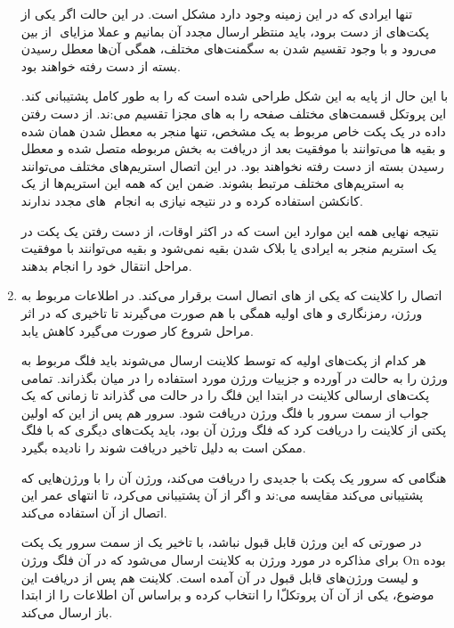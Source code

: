 \documentclass[12pt]{article}
\begin{document}
\begin{enumerate}
	تنها ایرادی که در این زمینه وجود دارد مشکل  است. در این حالت اگر یکی از پکت‌های  از دست برود، باید منتظر ارسال مجدد آن بمانیم و عملا مزایای ‌ از بین می‌رود و با وجود تقسیم شدن به سگمنت‌های مختلف، همگی ‌آن‌ها معطل رسیدن بسته از دست رفته خواهند بود.
	
	با این حال  از پایه به این شکل طراحی شده است که  را به طور کامل پشتیبانی کند. این پروتکل قسمت‌های مختلف صفحه را به  های مجزا تقسیم می‌:ند. از دست رفتن داده در یک پکت خاص مربوط به یک  مشخص، تنها منجر به معطل شدن همان  شده و بقیه  ها می‌توانند با موفقیت بعد از دریافت به بخش مربوطه متصل شده و معطل رسیدن بسته  از دست رفته نخواهند بود. در این اتصال استریم‌های مختلف  می‌توانند به استریم‌های مختلف  مرتبط بشوند. ضمن این که همه این استریم‌ها از یک کانکشن  استفاده کرده و در نتیجه نیازی به انجام ‌ های مجدد ندارند.


نتیجه نهایی همه این موارد این است که در اکثر اوقات، از دست رفتن یک پکت در یک استریم منجر به ایرادی یا بلاک شدن بقیه نمی‌شود و بقیه می‌توانند با موفقیت مراحل انتقال خود را انجام بدهند.


\item

اتصال  را کلاینت که یکی از  های اتصال است برقرار می‌کند. در  اطلاعات مربوط به ورژن، رمزنگاری و  های اولیه همگی با هم صورت می‌گیرند تا تاخیری که در اثر مراحل شروع کار صورت می‌گیرد کاهش یابد. 

هر کدام از پکت‌های اولیه که توسط کلاینت ارسال می‌شوند باید فلگ مربوط به ورژن را به حالت  در آورده و جزییات ورژن مورد استفاده را در میان بگذراند. تمامی پکت‌های ارسالی کلاینت در ابتدا این فلگ را در حالت  می گذراند تا زمانی که یک جواب از سمت سرور با فلگ ورژن  دریافت شود. سرور هم پس از این که اولین پکتی از کلاینت را دریافت کرد که فلگ ورژن آن  بود، باید پکت‌های دیگری که با فلگ  ممکن است به دلیل تاخیر دریافت شوند را نادیده بگیرد.

هنگامی که سرور یک پکت با  جدیدی را دریافت می‌کند، ورژن آن را با ورژن‌هایی که پشتیبانی می‌کند مقایسه می‌:ند و اگر از آن پشتیبانی می‌کرد، تا انتهای عمر این اتصال از آن استفاده می‌کند.

در صورتی که این ورژن قابل قبول نباشد، با تاخیر یک  از سمت سرور یک پکت برای مذاکره در مورد ورژن به کلاینت ارسال می‌شود که در آن فلگ ورژن On بوده و لیست ورژن‌های قابل قبول در آن آمده است. کلاینت هم پس از دریافت این موضوع، یکی از آن آن پروتکل‌ّا را انتخاب کرده و براساس آن اطلاعات را از ابتدا باز ارسال می‌کند.


\end{enumerate}
\end{document}
